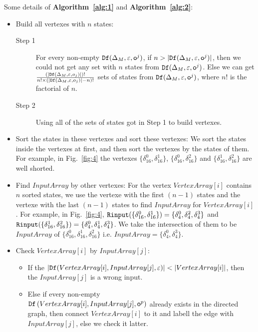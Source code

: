 Some details of {\bf Algorithm~\ref{alg:1}} and {\bf Algorithm~\ref{alg:2}}:
\begin{itemize}
\item Build all vertexes with $n$ states:
\begin{description}
\item[Step 1] For every non-empty ${\tt Df}(\Delta_M,\varepsilon,\mathsf{o}^{j})$, if $n>|{\tt Df}(\Delta_M,\varepsilon,\mathsf{o}^{j})|$, then we could not get any set with $n$ states from ${\tt Df}(\Delta_M,\varepsilon,\mathsf{o}^{j})$. Else we can get $\frac{(|{\tt Df}(\Delta_M,\varepsilon,o_j)|)!}{n!\times (|{\tt Df}(\Delta_M,\varepsilon,o_j)|-n)!}$ sets of states from ${\tt Df}(\Delta_M,\varepsilon,\mathsf{o}^{j})$, where $n!$ is the factorial of $n$.
\item[Step 2] Using all of the sets of states got in Step 1 to build vertexes. 
\end{description}
 \item Sort the states in these vertexes and sort these vertexes: We sort the states inside the vertexes at first, and then sort the vertexes by the states of them. For example, in Fig.~\ref{fig:4} the vertexes $\{\delta_{16}^0,\delta_{16}^1\}$, $\{\delta_{16}^0,\delta_{16}^2\}$ and $\{\delta_{16}^1,\delta_{16}^2\}$ are well shorted. 
  \item Find $InputArray$ by other vertexes:
   For the vertex $VertexArray[i]$ contains $n$ sorted states, we use the vertexe with the first $(n-1)$ states and the vertexe with the last $(n-1)$ states to find $InputArray$ for $VertexArray[i]$. For example, in Fig.~\ref{fig:4}, ${\tt Rinput}(\{\delta_{16}^0,\delta_{16}^1\})=\{\delta_{4}^0,\delta_{4}^2,\delta_{4}^3\}$ and ${\tt Rinput}(\{\delta_{16}^1,\delta_{16}^2\})=\{\delta_{4}^0,\delta_{4}^1,\delta_{4}^3\}$. We take the intersection of them to be $InputArray$ of $\{\delta_{16}^0,\delta_{16}^1,\delta_{16}^2\}$ i.e. $InputArray=\{\delta_{4}^0,\delta_{4}^3\}$. 
  \item Check $VertexArray[i]$ by $InputArray[j]$:
     
\begin{itemize}
\item If the $|\Ded(VertexArray[i],InputArray[j],\varepsilon)|<|VertexArray[i]|$, then the $InputArray[j]$ is a wrong input.
\item Else if every non-empty \\${\tt Df}\left(VertexArray[i],InputArray[j],\mathsf{o}^{p}\right)$ already exists in the directed graph, then connect $VertexArray[i]$ to it and labell the edge with $InputArray[j]$, else we check it latter. 
\end{itemize} 
\end{itemize} 


